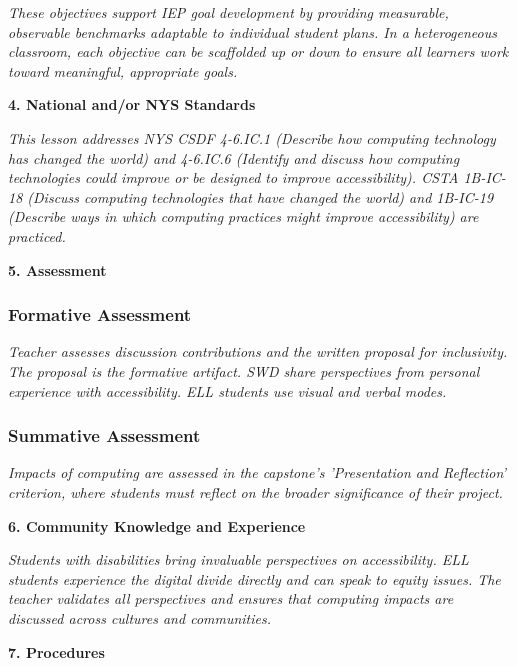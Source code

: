 \documentclass[11pt,letterpaper]{article}
\begin{document}
\textit{These objectives support IEP goal development by providing measurable, observable benchmarks adaptable to individual student plans. In a heterogeneous classroom, each objective can be scaffolded up or down to ensure all learners work toward meaningful, appropriate goals.}

\textbf{4. National and/or NYS Standards}

\textit{This lesson addresses NYS CSDF 4-6.IC.1 (Describe how computing technology has changed the world) and 4-6.IC.6 (Identify and discuss how computing technologies could improve or be designed to improve accessibility). CSTA 1B-IC-18 (Discuss computing technologies that have changed the world) and 1B-IC-19 (Describe ways in which computing practices might improve accessibility) are practiced.}

\newpage
\textbf{5. Assessment}

\subsubsection{Formative Assessment}

\textit{Teacher assesses discussion contributions and the written proposal for inclusivity. The proposal is the formative artifact. SWD share perspectives from personal experience with accessibility. ELL students use visual and verbal modes.}

\subsubsection{Summative Assessment}

\textit{Impacts of computing are assessed in the capstone's 'Presentation and Reflection' criterion, where students must reflect on the broader significance of their project.}

\textbf{6. Community Knowledge and Experience}

\textit{Students with disabilities bring invaluable perspectives on accessibility. ELL students experience the digital divide directly and can speak to equity issues. The teacher validates all perspectives and ensures that computing impacts are discussed across cultures and communities.}

\textbf{7. Procedures}
\end{document}
